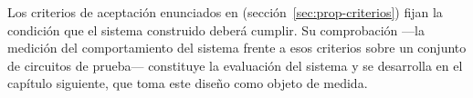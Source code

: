 Los criterios de aceptación enunciados en (sección~\ref{sec:prop-criterios}) fijan la condición que el sistema construido deberá cumplir. Su comprobación —la medición del comportamiento del sistema frente a esos criterios sobre un conjunto de circuitos de prueba— constituye la evaluación del sistema y se desarrolla en el capítulo siguiente, que toma este diseño como objeto de medida.
